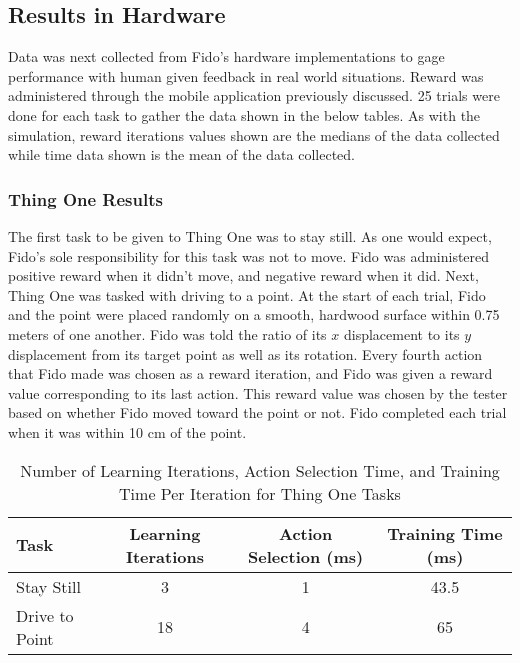 \subsection{Results in Hardware}

Data was next collected from Fido's hardware implementations to gage performance with human given feedback in real world situations.
Reward was administered through the mobile application previously discussed.  25 trials were done for each task to gather the data shown in the below tables.  As with the simulation, reward iterations values shown are the medians of the data collected while time data shown is the mean of the data collected.

\subsubsection{Thing One Results}

The first task to be given to Thing One was to stay still.
As one would expect, Fido's sole responsibility for this task was not to move.
Fido was administered positive reward when it didn't move, and negative reward when it did.
Next, Thing One was tasked with driving to a point.
At the start of each trial, Fido and the point were placed randomly on a smooth, hardwood surface within 0.75 meters of one another.
Fido was told the ratio of its $x$ displacement to its $y$ displacement from its target point as well as its rotation.
Every fourth action that Fido made was chosen as a reward iteration, and Fido was given a reward value corresponding to its last action.
This reward value was chosen by the tester based on whether Fido moved toward the point or not.
Fido completed each trial when it was within 10 cm of the point.


\begin{table}[ht]
	\centering
	\begin{tabular}{@{}lccc@{}}
		\toprule
		Task             & Learning Iterations & Action Selection (ms) & Training Time (ms) \\ \midrule
		Stay Still       & 3                   & 1                    & 43.5                  \\
		Drive to Point   & 18                  & 4                     & 65                  \\
	\end{tabular}
	\caption{Number of Learning Iterations, Action Selection Time, and Training Time Per Iteration for Thing One Tasks}
	\label{tab:data2}
\end{table}

